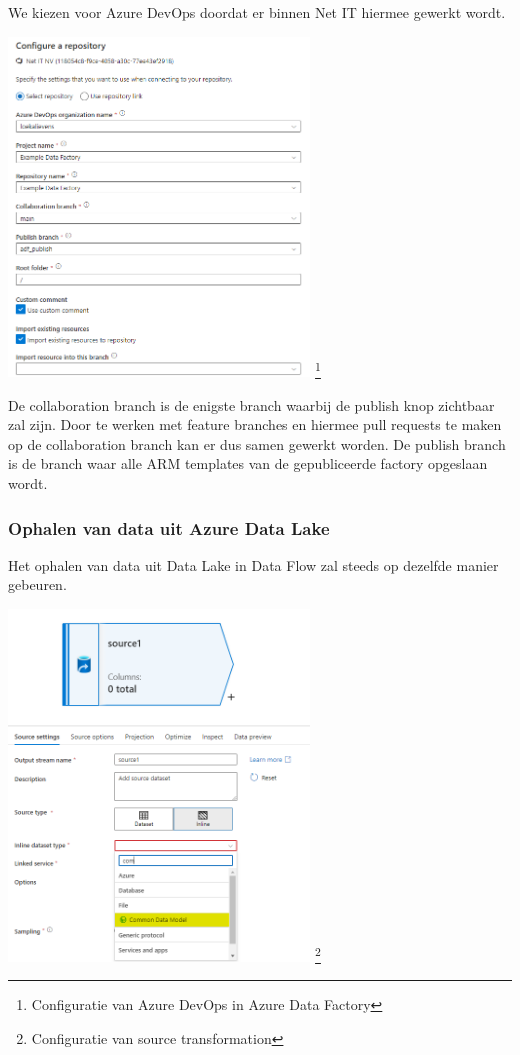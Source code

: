 We kiezen voor Azure DevOps doordat er binnen Net IT hiermee gewerkt wordt.

\begin{center}
    \includegraphics[width=0.6\textwidth]{./graphics/adf/setup_repository_3_specific.png}
    \footnote{Configuratie van Azure DevOps in Azure Data Factory}
\end{center}

De collaboration branch is de enigste branch waarbij de publish knop zichtbaar zal zijn. Door te werken met feature branches en hiermee pull requests te maken op de collaboration branch kan er dus samen gewerkt worden. De publish branch is de branch waar alle ARM templates van de gepubliceerde factory opgeslaan wordt.

\subsubsection{Ophalen van data uit Azure Data Lake}

Het ophalen van data uit Data Lake in Data Flow zal steeds op dezelfde manier gebeuren. 

\begin{center}
    \includegraphics[width=0.6\textwidth]{./graphics/adf/source_table_1_specific.png}
    \footnote{Configuratie van source transformation}
\end{center}

